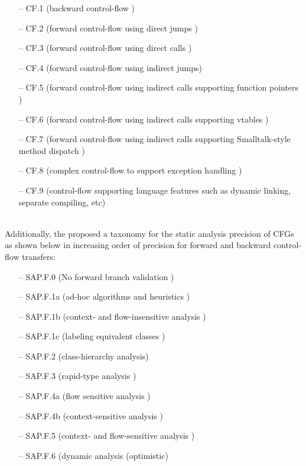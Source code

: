 \documentclass[dvips,12pt]{article}
\begin{document}
\newline
\begin{itemize}[noitemsep,nolistsep]
\item[--] CF.1 (backward control-flow )
\item[--] CF.2 (forward control-flow using direct jumps )
\item[--] CF.3 (forward control-flow using direct calls )
\item[--] CF.4 (forward control-flow using indirect jumps)
\item[--] CF.5 (forward control-flow using indirect calls supporting function pointers )
\item[--] CF.6 (forward control-flow using indirect calls supporting vtables )
\item[--] CF.7 (forward control-flow using indirect calls supporting Smalltalk-style method dispatch )
\item[--] CF.8 (complex control-flow to support exception handling )
\item[--] CF.9 (control-flow supporting language features such as dynamic linking, separate compiling, etc)
\end{itemize}
\ \\
Additionally, the proposed a taxonomy for the static analysis precision of CFGs as shown below in increasing order of precision for forward and backward control-flow transfers:
\newline
\begin{itemize}[noitemsep,nolistsep]
\item[--] SAP.F.0  (No forward branch validation )
\item[--] SAP.F.1a (ad-hoc algorithms and heuristics )
\item[--] SAP.F.1b (context- and flow-insensitive analysis )
\item[--] SAP.F.1c (labeling equivalent classes )
\item[--] SAP.F.2  (class-hierarchy analysis)
\item[--] SAP.F.3  (rapid-type analysis )
\item[--] SAP.F.4a (flow sensitive analysis )
\item[--] SAP.F.4b (context-sensitive analysis )
\item[--] SAP.F.5  (context- and flow-sensitive analysis )
\item[--] SAP.F.6  (dynamic analysis (optimistic)
\end{itemize}
\ \\
\end{document}
